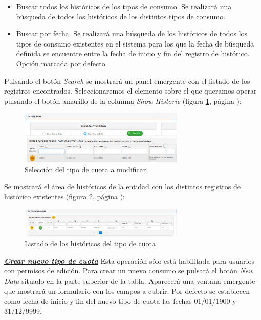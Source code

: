 \begin{itemize}
\item Buscar todos los históricos de los tipos de consumo. Se realizará una búsqueda de todos los históricos de los distintos tipos de consumo.
\item Buscar por fecha. Se realizará una búsqueda de los históricos de todos los tipos de consumo existentes en el sistema para los que la fecha de búsqueda definida se encuentre entre la fecha de inicio y fin del registro de histórico. Opción marcada por defecto
\end{itemize}

Pulsando el botón \emph{Search} se mostrará un panel emergente con el listado de los registros encontrados. Seleccionaremos el elemento sobre el que queramos operar pulsando el botón amarillo de la columna \emph{Show Historic} (figura \ref{fig:seleccion-tipo-cuota}, página \pageref{fig:seleccion-tipo-cuota}):

\begin{figure}[H]
  \centering
  \includegraphics[width=0.70\textwidth]{imaxes/seleccion-tipo-cuota.png}
  \caption{Selección del tipo de cuota a modificar}
  \label{fig:seleccion-tipo-cuota}
\end{figure}


Se mostrará el área de históricos de la entidad con los distintos registros de histórico existentes (figura \ref{fig:listado-historicos-tipo-cuota}, página \pageref{fig:listado-historicos-tipo-cuota}):

\begin{figure}[H]
  \centering
  \includegraphics[width=0.70\textwidth]{imaxes/listado-historicos-tipo-cuota.png}
  \caption{Listado de los históricos del tipo de cuota}
  \label{fig:listado-historicos-tipo-cuota}
\end{figure}



\underline{\textsl{\textbf{Crear nuevo tipo de cuota}}}\newline
Esta operación sólo está habilitada para usuarios con permisos de edición.
Para crear un nuevo consumo se pulsará el botón \textit{New Data} situado en la parte superior de la tabla. Aparecerá una ventana emergente que mostrará un formulario con los campos a cubrir. Por defecto se establecen como fecha de inicio y fin del nuevo tipo de cuota las fechas 01/01/1900 y 31/12/9999.

